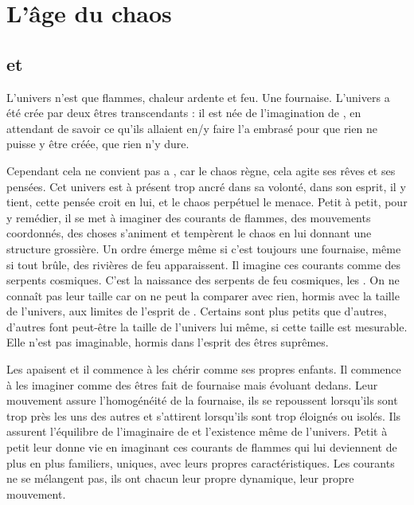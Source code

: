 \chapter{L'âge du chaos}


\section{\Mey et \Cind}

L’univers n’est que flammes, chaleur ardente et feu. Une fournaise. L’univers a été crée par deux êtres transcendants : il est née de l’imagination de \Mey, en attendant de savoir ce qu’ils allaient en/y faire \Cind l’a embrasé pour que rien ne puisse y être créée, que rien n’y dure. 

Cependant cela ne convient pas a \Mey, car le chaos règne, cela agite ses rêves et ses pensées. Cet univers est à présent trop ancré dans sa volonté, dans son esprit, il y tient, cette pensée croit en lui, et le chaos perpétuel le menace. Petit à petit, pour y remédier, il se met à imaginer des courants de flammes, des mouvements coordonnés, des choses s’animent et tempèrent le chaos en lui donnant une structure grossière. Un ordre émerge même si c’est toujours une fournaise, même si tout brûle, des rivières de feu apparaissent. Il imagine ces courants comme des serpents cosmiques. C’est la naissance des serpents de feu cosmiques, les \SerpentsCosmiques. On ne connaît pas leur taille car on ne peut la comparer avec rien, hormis avec la taille de l’univers, aux limites de l’esprit de \Mey. Certains sont plus petits que d’autres, d’autres font peut-être la taille de l’univers lui même, si cette taille est mesurable. Elle n’est pas imaginable, hormis dans l’esprit des êtres suprêmes.

Les \SerpentsCosmiques apaisent \Mey et il commence à les chérir comme ses propres enfants. Il commence à les imaginer comme des êtres fait de fournaise mais évoluant dedans. Leur mouvement assure l’homogénéité de la fournaise, ils se repoussent lorsqu’ils sont trop près les uns des autres et s’attirent lorsqu’ils sont trop éloignés ou isolés. Ils assurent l’équilibre de l’imaginaire de \Mey et l’existence même de l’univers. Petit à petit \Mey leur donne vie en imaginant ces courants de flammes qui lui deviennent de plus en plus familiers, uniques, avec leurs propres caractéristiques. Les courants ne se mélangent pas, ils ont chacun leur propre dynamique, leur propre mouvement.

